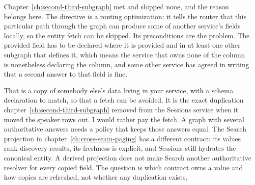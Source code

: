 %
Chapter~\ref{ch:second-third-subgraph} met  and shipped none,
and the reason belongs here. The directive is a routing optimization: it tells
the router that this particular path through the graph can produce some of
another service's fields locally, so the entity fetch can be skipped. Its
preconditions are the problem. The provided field has to be declared
 where it is provided and  in at least one
other subgraph that defines it, which means the service that owns none of the
column is nonetheless declaring the column, and some other service has agreed
in writing that a second answer to that field is fine.

%
That is a copy of somebody else's data living in your service, with a schema
declaration to match, so that a fetch can be avoided. It is the exact
duplication chapter~\ref{ch:second-third-subgraph} removed from the Sessions
service when it moved the speaker rows out. I would rather pay the fetch. A
graph with several authoritative answers needs a policy that keeps those
answers equal. The Search projection in chapter~\ref{ch:cross-seam-paging}
has a different contract: its values rank discovery results, its freshness is
explicit, and Sessions still hydrates the canonical entity. A derived
projection does not make Search another authoritative resolver for every
copied field. The question is which contract owns a value and how copies
are refreshed, not whether any duplication exists.
%

